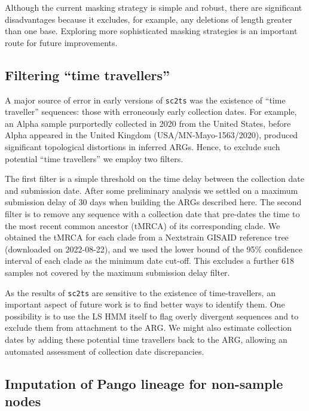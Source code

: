 \documentclass{article}
\begin{document}
Although the current masking strategy is simple and robust,
there are significant disadvantages because it excludes, for example, any
deletions of length greater than one base. Exploring more sophisticated
masking strategies is an important route for future improvements.

\subsection{Filtering ``time travellers''}
\label{sec:filtering_time_travellers}
A major source of error in early versions of \texttt{sc2ts} was
the existence of ``time traveller'' sequences: those with erroneously
early collection dates.
For example, an Alpha sample purportedly collected in 2020 from the United States,
before Alpha appeared in the United Kingdom (USA/MN-Mayo-1563/2020),
produced significant topological distortions in
inferred ARGs.
Hence, to exclude such potential ``time travellers'' we employ two filters.

The first filter is a simple threshold on
the time delay between the collection date and submission date.
After some preliminary analysis we settled on a maximum submission delay
of 30 days when building the ARGs described here.
The second filter is to remove any sequence with a collection date that
pre-dates the
time to the most recent common ancestor (tMRCA) of its corresponding clade.
We obtained the tMRCA for each clade from a Nextstrain GISAID reference tree
(downloaded on 2022-08-22), and we used the lower bound of the 95\%
confidence interval of each clade as the minimum date cut-off.
This excludes a further 618 samples not covered by the maximum submission
delay filter.

As the results of \texttt{sc2ts} are sensitive to the existence of
time-travellers, an important aspect of future work is to find better ways
to identify them. One possibility is to use the LS HMM itself to flag
overly divergent sequences and to exclude them from attachment to the ARG.
We might also estimate collection dates by adding these potential time travellers
back to the ARG, allowing an automated assessment of collection date discrepancies.

\subsection{Imputation of Pango lineage for non-sample nodes}
\end{document}
